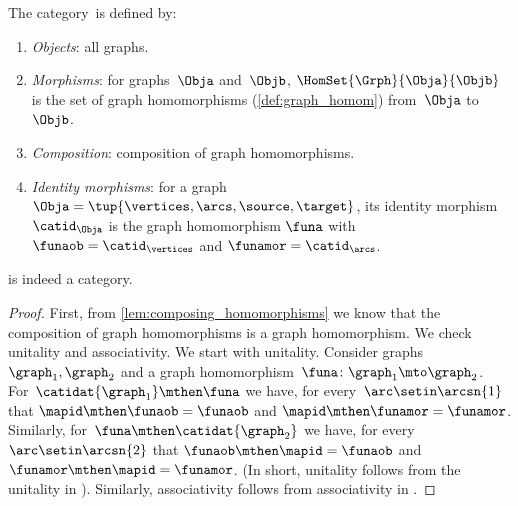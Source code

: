 \begin{ctdefinition}
    \label{def:Grph}
    The category~\Grph is defined by:
    \begin{enumerate}
        \item \emph{Objects}: all graphs.
        \item \emph{Morphisms}: for graphs~$\Obja$ and~$\Objb$, $\HomSet{\Grph}{\Obja}{\Objb}$ is the set of graph homomorphisms (\cref{def:graph_homom}) from~$\Obja$ to~$\Objb$.
        \item \emph{Composition}: composition of graph homomorphisms.
         \item \emph{Identity morphisms}: for a graph~$\Obja =\tup{\vertices,\arcs,\source,\target}$, 
              its identity morphism $\catid_\Obja$ is the graph homomorphism $\funa$ with $\funaob = \catid_{\vertices}$ and $\funamor= \catid_{\arcs}$.
    \end{enumerate}
\end{ctdefinition}

\begin{lemma}\label{lem:Grph-is-cat}
    \Grph is indeed a category.
\end{lemma}

\begin{proof}
    First, from \cref{lem:composing_homomorphisms} we know that the composition of graph homomorphisms is a graph homomorphism.
    We check unitality and associativity.
    We start with unitality.
    Consider graphs~$\graph_1,\graph_2$ and a graph homomorphism~$\funa\colon \graph_1\mto \graph_2$.
    For~$\catidat{\graph_1}\mthen \funa$ we have, for every~$\arc \setin \arcsn{1}$ that $\mapid\mthen \funaob=\funaob$ and $\mapid\mthen \funamor=\funamor$.
    Similarly, for~$\funa \mthen \catidat{\graph_2}$ we have, for every $\arc \setin \arcsn{2}$ that $\funaob\mthen \mapid=\funaob$ and $\funamor \mthen \mapid=\funamor$.
    (In short, unitality follows from the unitality in \Set).
    Similarly, associativity follows from associativity in \Set.
\end{proof}
